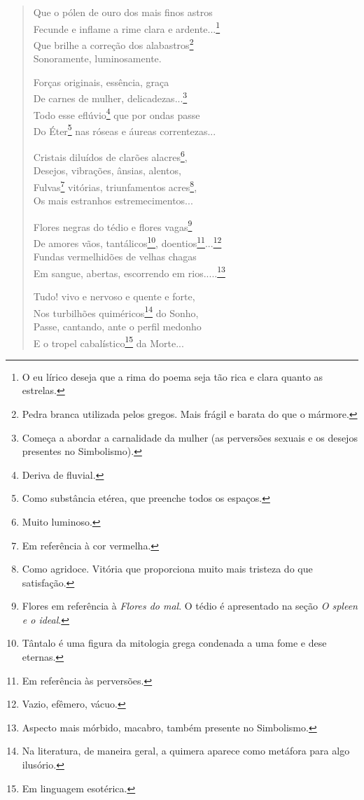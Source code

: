 \begin{verse}
 Que o pólen de ouro dos mais finos astros \\
 Fecunde e inflame a rime clara e ardente...\footnote{O eu lírico deseja que a rima do poema seja tão rica e clara quanto as estrelas.} \\
 Que brilhe a correção dos alabastros\footnote{Pedra branca utilizada pelos gregos. Mais frágil e barata do que o mármore.} \\
 Sonoramente, luminosamente.
 
 Forças originais, essência, graça \\
 De carnes de mulher, delicadezas...\footnote{Começa a abordar a carnalidade da mulher (as perversões sexuais e os desejos presentes no Simbolismo).} \\
 Todo esse eflúvio\footnote{Deriva de fluvial.} que por ondas passe \\
 Do Éter\footnote{Como substância etérea, que preenche todos os espaços.} nas róseas e áureas correntezas...
 
 Cristais diluídos de clarões alacres\footnote{Muito luminoso.}, \\
 Desejos, vibrações, ânsias, alentos, \\
 Fulvas\footnote{Em referência à cor vermelha.} vitórias, triunfamentos acres\footnote{Como agridoce. Vitória que proporciona muito mais tristeza do que satisfação.}, \\
 Os mais estranhos estremecimentos...
 
 Flores negras do tédio e flores vagas\footnote{Flores em referência à \textit{Flores do mal}. O tédio é apresentado na seção \textit{O spleen e o ideal}.} \\
 De amores vãos, tantálicos\footnote{Tântalo é uma figura da mitologia grega condenada a uma fome e dese eternas.}, doentios\footnote{Em referência às perversões.}...\footnote{Vazio, efêmero, vácuo.} \\
 Fundas vermelhidões de velhas chagas \\
 Em sangue, abertas, escorrendo em rios.....\footnote{Aspecto mais mórbido, macabro, também presente no Simbolismo.}
 
 Tudo! vivo e nervoso e quente e forte, \\
 Nos turbilhões quiméricos\footnote{Na literatura, de maneira geral, a quimera aparece como metáfora para algo ilusório.} do Sonho, \\
 Passe, cantando, ante o perfil medonho \\
 E o tropel cabalístico\footnote{Em linguagem esotérica.} da Morte... 
 

\end{verse}
